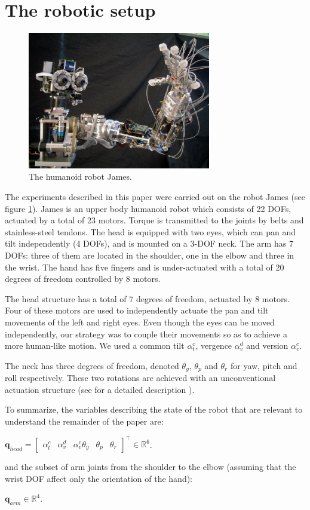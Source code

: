 \section{The robotic setup}
\label{Sec:setup}

\begin{figure}
\centering
\includegraphics[width=80mm]{Figure/James1.eps}
\caption{The humanoid robot James.}
\label{Fig:PicureJames}
\end{figure}

The experiments described in this paper were carried out on the robot 
James (see figure \ref{Fig:PicureJames}). James is an upper body 
humanoid robot which consists of 22 DOFs, actuated by a total of 
23 motors. Torque is transmitted to the joints by belts and 
stainless-steel tendons. The head is equipped with two eyes, which 
can pan and tilt independently (4 DOFs), and is mounted on a 3-DOF 
neck. The arm has 7 DOFs: three of them are located in the shoulder, 
one in the elbow and three in the wrist. The hand has five fingers 
and is under-actuated with a total of 20 degrees of freedom controlled 
by 8 motors. 

The head structure has a total of 7 degrees of freedom, actuated by 8 
motors. Four of these motors are used to independently actuate the pan 
and tilt movements of the left and right eyes. Even though the eyes 
can be moved independently, our strategy was to couple their movements 
so as to achieve a more human-like motion. We used a common tilt 
$\alpha_t^c$, vergence $\alpha_v^d$ and version $\alpha_v^c$. 

The neck has three degrees of freedom, denoted $\theta_y$, 
$\theta_p$ and $\theta_r$ for yaw, pitch and roll respectively. These 
two rotations are achieved with an unconventional actuation structure 
(see for a detailed description \cite{jamone06james}). 

To summarize, the variables describing the state of the robot that 
are relevant to understand the remainder of the paper are:

$\mathbf q_{head} = \begin{bmatrix} \alpha_t^c & \alpha_v^d & \alpha_v^c
\theta_y & \theta_p & \theta_r \end{bmatrix}^\top \in \mathbb R^6$.

and the subset of arm joints from the shoulder to the elbow (assuming
that the wrist DOF affect only the orientation of the hand):

$\mathbf q_{arm} \in \mathbb R^4$.



